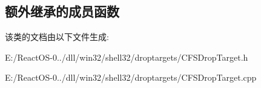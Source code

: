 \subsection*{额外继承的成员函数}


该类的文档由以下文件生成\+:\begin{DoxyCompactItemize}
\item 
E\+:/\+React\+O\+S-\/0../dll/win32/shell32/droptargets/C\+F\+S\+Drop\+Target.\+h\item 
E\+:/\+React\+O\+S-\/0../dll/win32/shell32/droptargets/C\+F\+S\+Drop\+Target.\+cpp\end{DoxyCompactItemize}

